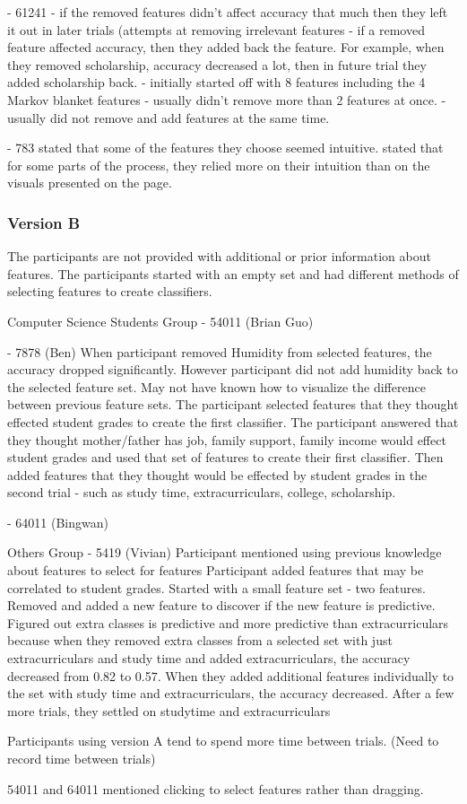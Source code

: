 - 61241 
    - if the removed features didn’t affect accuracy that much then they left it out in later trials (attempts at removing irrelevant features
    - if a removed feature affected accuracy, then they added back the feature. For example, when they removed scholarship, accuracy decreased a lot, then in future trial they added scholarship back. 
    - initially started off with 8 features including the 4 Markov blanket features
    - usually didn't remove more than 2 features at once. 
    - usually did not remove and add features at the same time.
    
- 783
    stated that some of the features they choose seemed intuitive. 
    stated that for some parts of the process, they relied more on their intuition than on the visuals presented on the page. 
    
\subsubsection{ Version B }
The participants are not provided with additional or prior information about features. The participants started with an empty set and had different methods of selecting features to create classifiers. 

Computer Science Students Group
- 54011 (Brian Guo)
     
    
- 7878 (Ben)
     When participant removed Humidity from selected features, the accuracy dropped significantly. However participant did not add humidity back to the selected feature set. May not have known how to visualize the difference between previous feature sets. The participant selected features that they thought effected student grades to create the first classifier. The participant answered that they thought mother/father has job, family support, family income would effect student grades and used that set of features to create their first classifier. Then added features that they thought would be effected by student grades in the second trial - such as study time, extracurriculars, college, scholarship.
     
- 64011 (Bingwan)
    
    
    
    
    

Others Group
- 5419 (Vivian)
    Participant mentioned using previous knowledge about features to select for features
    Participant added features that may be correlated to student grades. 
    Started with a small feature set - two features. Removed and added a new feature to discover if the new feature is predictive. Figured out extra classes is predictive and more predictive than extracurriculars because when they removed extra classes from a selected set with just extracurriculars and study time and added extracurriculars, the accuracy decreased from 0.82 to 0.57. When they added additional features individually to the set with study time and extracurriculars, the accuracy decreased. After a few more trials, they settled on studytime and extracurriculars

Participants using version A tend to spend more time between trials. (Need to record time between trials)

54011 and 64011 mentioned clicking to select features rather than dragging. 